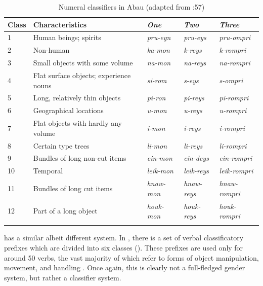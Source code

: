 \documentclass[output=collectionpaper]{langsci/langscibook}
\begin{document}
\begin{table}
\begin{tabularx}{\textwidth}{lX>{\itshape}l>{\itshape}l>{\itshape}l}
\lsptoprule

Class & Characteristics & \normalfont One & \normalfont Two & \normalfont Three\\
\midrule
1 & Human beings; spirits & pru-eyn & pru-eys & pru-ompri\\
2 & Non-human & ka-mon & k-reys & k-rompri\\
3 & Small objects with some volume & na-mon & na-reys & na-rompri\\
4 & Flat surface objects; experience nouns & si-rom & s-eys & s-ompri\\
5 & Long, relatively thin objects & pi-ron & pi-reys & pi-rompri\\
6 & Geographical locations & u-mon & u-reys & u-rompri\\
7 & Flat objects with hardly any volume & i-mon & i-reys & i-rompri\\
8 & Certain type trees & li-mon & li-reys & li-rompri\\
9 & Bundles of long non-cut items & ein-mon & ein-deys & ein-rompri\\
10 & Temporal & leik-mon & leik-reys & leik-rompri\\
11 & Bundles of long cut items & hnaw-mon & hnaw-reys & hnaw-rompri\\
12 & Part of a long object & houk-mon & houk-reys & houk-rompri\\
\lspbottomrule
\end{tabularx}
\caption{Numeral classifiers in Abau (adapted from \citealt{Lock2011}:57)}
\label{tab:Svard:16}
\end{table}



 has a similar albeit different system. In , there is a set of verbal classificatory prefixes which are divided into six classes (). These prefixes are used only for around 50 verbs, the vast majority of which refer to forms of object manipulation, movement, and handling \citep[172]{Fedden2011}. Once again, this is clearly not a full-fledged gender system, but rather a classifier system.
\end{document}
